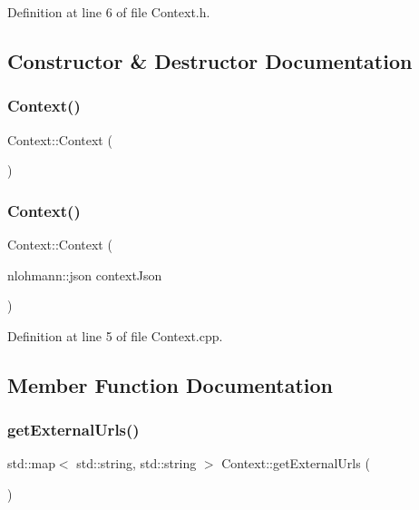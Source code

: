 Definition at line 6 of file Context.\+h.



\subsection{Constructor \& Destructor Documentation}
\mbox{\label{class_context_a652cdcd2eedc8dbd9110bd284c5d5cf0}} 
\subsubsection{\texorpdfstring{Context()}{Context()}\hspace{0.1cm}{\footnotesize\ttfamily [1/2]}}
{\footnotesize\ttfamily Context\+::\+Context (\begin{DoxyParamCaption}{ }\end{DoxyParamCaption})\hspace{0.3cm}{\ttfamily [default]}}

\mbox{\label{class_context_a7d464dcaf72102d84730800229fa9d26}} 
\subsubsection{\texorpdfstring{Context()}{Context()}\hspace{0.1cm}{\footnotesize\ttfamily [2/2]}}
{\footnotesize\ttfamily Context\+::\+Context (\begin{DoxyParamCaption}\item[{nlohmann\+::json}]{context\+Json }\end{DoxyParamCaption})}



Definition at line 5 of file Context.\+cpp.



\subsection{Member Function Documentation}
\mbox{\label{class_context_a60926513d1fe454e0d2eed5075b3670a}} 
\subsubsection{\texorpdfstring{get\+External\+Urls()}{getExternalUrls()}}
{\footnotesize\ttfamily std\+::map$<$ std\+::string, std\+::string $>$ Context\+::get\+External\+Urls (\begin{DoxyParamCaption}{ }\end{DoxyParamCaption})}



